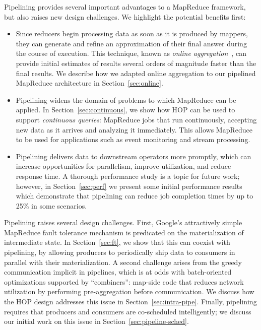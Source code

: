 Pipelining provides several important advantages to a MapReduce
framework, but also raises new design challenges. We highlight the
potential benefits first:
\begin{itemize}
\item
  Since reducers begin processing data as soon as it is produced by mappers,
  they can generate and refine an approximation of their final answer during the
  course of execution. This technique, known as \emph{online
    aggregation}~\cite{onlineagg}, can provide initial estimates of results
  several orders of magnitude faster than the final results.  We
  describe how we adapted online aggregation to our pipelined MapReduce
  architecture in Section~\ref{sec:online}.

\item
  Pipelining widens the domain of problems to which MapReduce can be applied. In
  Section~\ref{sec:continuous}, we show how HOP can be used to support
  \emph{continuous queries}: MapReduce jobs that run continuously, accepting new
  data as it arrives and analyzing it immediately. This allows MapReduce to be
  used for applications such as event monitoring and stream processing.

\item
  Pipelining delivers data to downstream operators more promptly, which can
  increase opportunities for parallelism, improve utilization, and reduce
  response time. A thorough performance study is a topic for future work;
  however, in Section~\ref{sec:perf} we present some initial performance
  results which demonstrate that pipelining can reduce job completion times by
  up to 25\% in some scenarios.
\end{itemize}

Pipelining raises several design challenges. First, Google's attractively simple
MapReduce fault tolerance mechanism is predicated on the materialization of
intermediate state. In Section~\ref{sec:ft}, we show that this can coexist with
pipelining, by allowing producers to periodically ship data to consumers in
parallel with their materialization.  A second challenge arises from the greedy
communication implicit in pipelines, which is at odds with batch-oriented
optimizations supported by ``combiners'': map-side code that reduces network
utilization by performing pre-aggregation before
communication. We discuss how the HOP design addresses this issue in
Section~\ref{sec:intra-pipe}.  Finally, pipelining requires that producers and
consumers are co-scheduled intelligently; we discuss our initial work on this
issue in Section~\ref{sec:pipeline-sched}.


